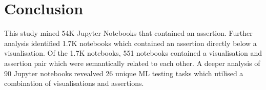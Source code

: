 \documentclass[conference]{IEEEtran}
\begin{document}

\section{Conclusion}\label{sec:conclude}

This study mined 54K Jupyter Notebooks that contained an assertion. Further analysis identified 1.7K notebooks which contained an assertion directly below a visualisation. Of the 1.7K notebooks, 551 notebooks contained a visualisation and assertion pair which were semantically related to each other. A deeper analysis of 90 Jupyter notebooks revealved 26 unique ML testing tasks which utilised a combination of visualisations and assertions.



\end{document}
